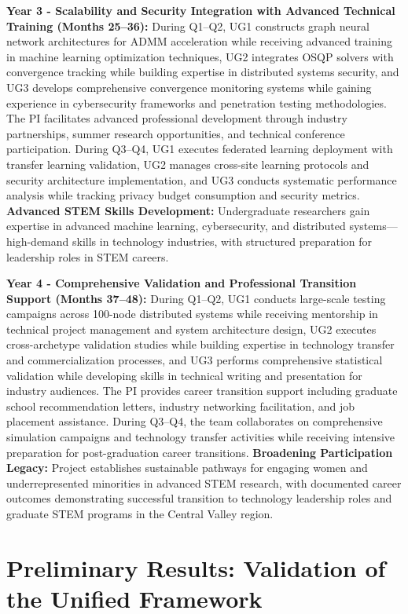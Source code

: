 \documentclass[12pt]{article}
\begin{document}
\textbf{Year 3 - Scalability and Security Integration with Advanced Technical Training (Months 25--36):} During Q1--Q2, UG1 constructs graph neural network architectures for ADMM acceleration while receiving advanced training in machine learning optimization techniques, UG2 integrates OSQP solvers with convergence tracking while building expertise in distributed systems security, and UG3 develops comprehensive convergence monitoring systems while gaining experience in cybersecurity frameworks and penetration testing methodologies. The PI facilitates advanced professional development through industry partnerships, summer research opportunities, and technical conference participation. During Q3--Q4, UG1 executes federated learning deployment with transfer learning validation, UG2 manages cross-site learning protocols and security architecture implementation, and UG3 conducts systematic performance analysis while tracking privacy budget consumption and security metrics. \textbf{Advanced STEM Skills Development:} Undergraduate researchers gain expertise in advanced machine learning, cybersecurity, and distributed systems---high-demand skills in technology industries, with structured preparation for leadership roles in STEM careers.

\textbf{Year 4 - Comprehensive Validation and Professional Transition Support (Months 37--48):} During Q1--Q2, UG1 conducts large-scale testing campaigns across 100-node distributed systems while receiving mentorship in technical project management and system architecture design, UG2 executes cross-archetype validation studies while building expertise in technology transfer and commercialization processes, and UG3 performs comprehensive statistical validation while developing skills in technical writing and presentation for industry audiences. The PI provides career transition support including graduate school recommendation letters, industry networking facilitation, and job placement assistance. During Q3--Q4, the team collaborates on comprehensive simulation campaigns and technology transfer activities while receiving intensive preparation for post-graduation career transitions. \textbf{Broadening Participation Legacy:} Project establishes sustainable pathways for engaging women and underrepresented minorities in advanced STEM research, with documented career outcomes demonstrating successful transition to technology leadership roles and graduate STEM programs in the Central Valley region.

\section{Preliminary Results: Validation of the Unified Framework}
\end{document}
